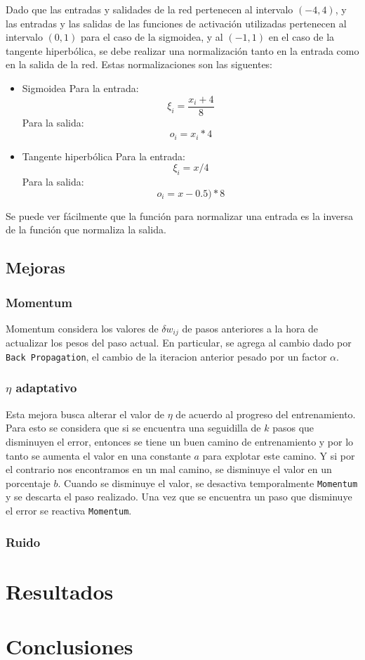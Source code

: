 \documentclass[a4paper,10pt]{article}
\begin{document}
        Dado que las entradas y salidades de la red pertenecen al intervalo $(-4, 4)$, y las entradas y las salidas de las funciones de activación utilizadas 
        pertenecen al intervalo $(0,1)$ para el caso de la sigmoidea, y al $(-1,1)$ en el caso de la tangente hiperbólica, se debe realizar una normalización 
        tanto en la entrada como en la salida de la red. Estas normalizaciones son las siguentes:

        \begin{itemize}
            \item Sigmoidea
                Para la entrada: \[ \xi_{i} = \frac{x_{i} + 4}{8} \]
                Para la salida: \[ o_{i} = x_{i} * 4 \]
            \item Tangente hiperbólica
                Para la entrada: \[ \xi_{i} = x / 4 \]
                Para la salida: \[ o_{i} = x - 0.5) * 8 \]
        \end{itemize}

        Se puede ver fácilmente que la función para normalizar una entrada es la inversa de la función que normaliza la salida.

\subsection{Mejoras}

    \subsubsection{Momentum}

    Momentum considera los valores de $\delta w_{ij}$ de pasos anteriores a la hora de actualizar los pesos del paso actual.
    En particular, se agrega al cambio dado por \texttt{Back Propagation}, el cambio de la iteracion anterior pesado por un factor $\alpha$.

    \subsubsection{$\eta$ adaptativo}

    Esta mejora busca alterar el valor de $\eta$ de acuerdo al progreso del entrenamiento.
    Para esto se considera que si se encuentra una seguidilla de $k$ pasos que disminuyen el error, entonces se tiene un buen camino de entrenamiento y por lo tanto se aumenta 
    el valor en una constante $a$ para explotar este camino. Y si por el contrario nos encontramos en un mal camino, se disminuye el valor en un porcentaje $b$.
    Cuando se disminuye el valor, se desactiva temporalmente \texttt{Momentum} y se descarta el paso realizado.
    Una vez que se encuentra un paso que disminuye el error se reactiva \texttt{Momentum}.

    \subsubsection{Ruido}

\section{Resultados}

\section{Conclusiones}



\end{document}
